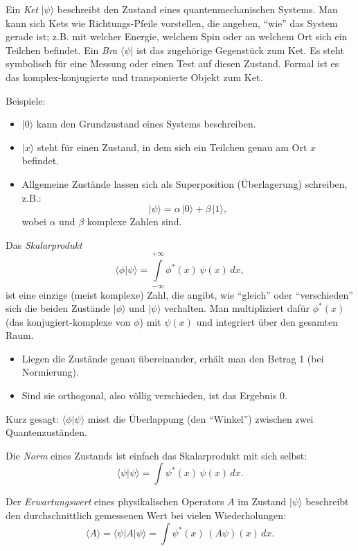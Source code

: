 Ein \emph{Ket} $|\psi\rangle$ beschreibt den Zustand eines quantenmechanischen Systems.
Man kann sich Kets wie Richtungs-Pfeile vorstellen, die angeben, ``wie'' das System gerade ist;
z.B. mit welcher Energie, welchem Spin oder an welchem Ort sich ein Teilchen befindet.
Ein \emph{Bra} $\langle\psi|$ ist das zugehörige Gegenstück zum Ket.
Es steht symbolisch für eine Messung oder einen Test auf diesen Zustand.
Formal ist es das komplex-konjugierte und transponierte Objekt zum Ket.

Beispiele:
\begin{itemize}
  \item $|0\rangle$ kann den Grundzustand eines Systems beschreiben.
  \item $|x\rangle$ steht für einen Zustand, in dem sich ein Teilchen genau am Ort $x$ befindet.
  \item Allgemeine Zustände lassen sich als Superposition (Überlagerung) schreiben, z.B.:
  \[
    |\psi\rangle = \alpha\,|0\rangle + \beta\,|1\rangle,
  \]
  wobei $\alpha$ und $\beta$ komplexe Zahlen sind.
\end{itemize}

Das \emph{Skalarprodukt}
\begin{equation}
  \langle \phi | \psi \rangle = \int\limits_{-\infty}^{+\infty} \phi^*(x)\,\psi(x)\,dx,
\end{equation}
ist eine einzige (meist komplexe) Zahl, die angibt, wie ``gleich'' oder ``verschieden'' sich die beiden Zustände $|\phi\rangle$ und $|\psi\rangle$ verhalten.
Man multipliziert dafür $\phi^*(x)$ (das konjugiert-komplexe von $\phi$) mit $\psi(x)$ und integriert über den gesamten Raum.
\begin{itemize}
	\item Liegen die Zustände genau übereinander, erhält man den Betrag 1 (bei Normierung).
	\item Sind sie orthogonal, also völlig verschieden, ist das Ergebnis 0.
\end{itemize}
Kurz gesagt:
$\langle \phi | \psi \rangle$ misst die Überlappung (den ``Winkel'') zwischen zwei Quantenzuständen.

Die \emph{Norm} eines Zustands ist einfach das Skalarprodukt mit sich selbst:
\begin{equation}
  \langle \psi | \psi \rangle = \int \psi^*(x)\,\psi(x)\,dx.
\end{equation}

Der \emph{Erwartungswert} eines physikalischen Operators $A$ im Zustand $|\psi\rangle$ beschreibt den durchschnittlich gemessenen Wert bei vielen Wiederholungen:
\begin{equation}
  \langle A \rangle = \langle \psi | A | \psi \rangle = \int \psi^*(x)\,(A\psi)(x)\,dx.
\end{equation}

